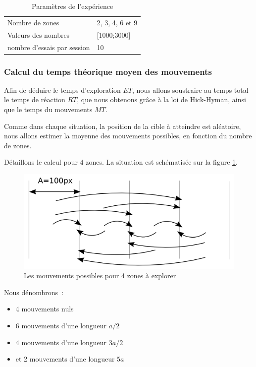 \documentclass[
]{book}
\providecommand{\tightlist}{%
  \setlength{\itemsep}{0pt}\setlength{\parskip}{0pt}}
\begin{document}
\begin{longtable}[]{@{}ll@{}}
\caption{\label{tab:parametres} Paramètres de
l'expérience}\tabularnewline
\toprule()
\endhead
Nombre de zones & 2, 3, 4, 6 et 9 \\
Valeurs des nombres & {[}1000;3000{]} \\
nombre d'essais par session & 10 \\
\bottomrule()
\end{longtable}

\hypertarget{calcul-du-temps-thuxe9orique-moyen-des-mouvements}{%
\subsubsection{Calcul du temps théorique moyen des mouvements}\label{calcul-du-temps-thuxe9orique-moyen-des-mouvements}}

Afin de déduire le temps d'exploration \(ET\),
nous allons soustraire au temps total le temps de réaction \(RT\),
que nous obtenons grâce à la loi de Hick-Hyman, ainsi que
le temps du mouvements \(MT\).

Comme dans chaque situation, la position de la cible à atteindre est
aléatoire, nous allons estimer la moyenne des mouvements possibles, en
fonction du nombre de zones.

Détaillons le calcul pour 4 zones. La situation est schématisée sur la
figure \ref{fig:mvts}.

\begin{figure}
\centering
\includegraphics{img/mvts.png}
\caption{\label{fig:mvts}Les mouvements possibles pour 4 zones à explorer}
\end{figure}

Nous dénombrons~:

\begin{itemize}
\tightlist
\item
  4 mouvements nuls
\item
  6 mouvements d'une longueur \(a/2\)
\item
  4 mouvements d'une longueur \(3a/2\)
\item
  et 2 mouvements d'une longueur \(5a\)
\end{itemize}
\end{document}
